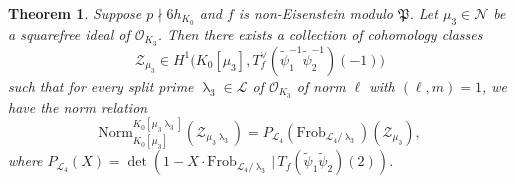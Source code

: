 \documentclass[10pt,letterpaper]{amsart}
\theoremstyle{plain}
\newtheorem{thm}{Theorem}[subsection] %
\theoremstyle{definition}
\theoremstyle{definition}
\theoremstyle{plain}
\theoremstyle{plain}
\theoremstyle{plain}
\theoremstyle{remark}
\numberwithin{equation}{section}
\DeclareMathOperator{\la}{\lambda}
\def\cL{{\mathcal L}}
\def\cO{\mathcal O}
\begin{document}
\begin{thm}\label{maintheorem1}
Suppose $p\nmid 6h_{K_0}$ and $f$ is non-Eisenstein modulo $\mathfrak{P}$. Let $\mu_3\in\mathcal{N}$ be a squarefree ideal of $\cO_{K_3}$. Then there exists a collection of cohomology classes
\[
\mathcal{Z}_{\mu_3}\in H^1\bigl(K_0[\mu_3],T_f^{\vee}(\tilde{\psi}_{1}^{-1}\tilde{\psi}_{2}^{-1})(-1)\bigr)
\]
such that for every split prime $\la_3\in\mathcal{L}$ of $\cO_{K_3}$ of norm $\ell$ with $(\ell,m)=1$, we have the norm relation
\begin{equation*}
    \mathrm{Norm}_{K_0[\mu_3]}^{K_0[\mu_3\la_3]}(\mathcal{Z}_{\mu_3\la_3})=P_{\cL_4}(\mathrm{Frob}_{\cL_4/\la_3})(\mathcal{Z}_{\mu_3}),
\end{equation*}
where $P_{\cL_4}(X)=\det(1-X\cdot \mathrm{Frob}_{\cL_4/\la_3}\,|\,T_f(\tilde{\psi}_1\tilde{\psi}_2)(2))$.
\end{thm}

\end{document}
